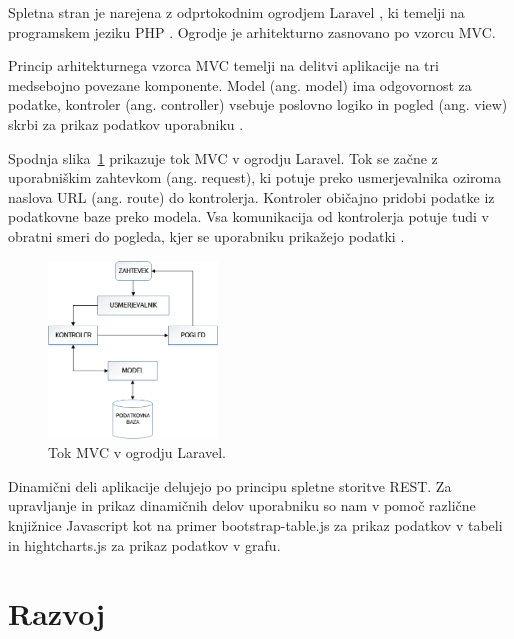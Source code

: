 \documentclass[a4paper, 12pt]{book}
\begin{document}
Spletna stran je narejena z odprtokodnim ogrodjem Laravel \cite{laravel-main-page}, ki temelji na programskem jeziku PHP \cite{php-jezik}. Ogrodje je arhitekturno zasnovano po vzorcu MVC. 

Princip arhitekturnega vzorca MVC temelji na delitvi aplikacije na tri medsebojno povezane komponente. Model (ang. model) ima odgovornost za podatke, kontroler (ang. controller) vsebuje poslovno logiko in pogled (ang. view) skrbi za prikaz podatkov uporabniku \cite{mvc-arhitektura}.

Spodnja slika~\ref{mvc-laravel} prikazuje tok MVC v ogrodju Laravel. Tok se začne z uporabniškim zahtevkom (ang. request), ki potuje preko usmerjevalnika oziroma naslova URL (ang. route) do kontrolerja. Kontroler običajno pridobi podatke iz podatkovne baze preko modela. Vsa komunikacija od kontrolerja potuje tudi v obratni smeri do pogleda, kjer se uporabniku prikažejo podatki \cite{poglavje_laravel_mvc}. 

\begin{figure}[h]
\begin{center}
\includegraphics[width=0.4\textwidth]{slike/Laravel-MVC.png}
\end{center}
\caption{Tok MVC v ogrodju Laravel.}
\label{mvc-laravel}
\end{figure}

\clearpage

Dinamični deli aplikacije delujejo po principu spletne storitve REST. Za upravljanje in prikaz dinamičnih delov uporabniku so nam v pomoč različne knjižnice Javascript kot na primer bootstrap-table.js \cite{bootstraptable} za prikaz podatkov v tabeli in hightcharts.js \cite{hightchars-js} za prikaz podatkov v grafu.






\chapter{Razvoj}
\label{razvoj}
\end{document}
